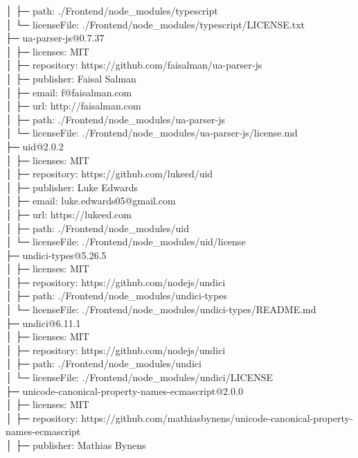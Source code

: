 │  ├─ path: ./Frontend/node\_modules/typescript\\
│  └─ licenseFile: ./Frontend/node\_modules/typescript/LICENSE.txt\\
├─ ua-parser-js@0.7.37\\
│  ├─ licenses: MIT\\
│  ├─ repository: https://github.com/faisalman/ua-parser-js\\
│  ├─ publisher: Faisal Salman\\
│  ├─ email: f@faisalman.com\\
│  ├─ url: http://faisalman.com\\
│  ├─ path: ./Frontend/node\_modules/ua-parser-js\\
│  └─ licenseFile: ./Frontend/node\_modules/ua-parser-js/license.md\\
├─ uid@2.0.2\\
│  ├─ licenses: MIT\\
│  ├─ repository: https://github.com/lukeed/uid\\
│  ├─ publisher: Luke Edwards\\
│  ├─ email: luke.edwards05@gmail.com\\
│  ├─ url: https://lukeed.com\\
│  ├─ path: ./Frontend/node\_modules/uid\\
│  └─ licenseFile: ./Frontend/node\_modules/uid/license\\
├─ undici-types@5.26.5\\
│  ├─ licenses: MIT\\
│  ├─ repository: https://github.com/nodejs/undici\\
│  ├─ path: ./Frontend/node\_modules/undici-types\\
│  └─ licenseFile: ./Frontend/node\_modules/undici-types/README.md\\
├─ undici@6.11.1\\
│  ├─ licenses: MIT\\
│  ├─ repository: https://github.com/nodejs/undici\\
│  ├─ path: ./Frontend/node\_modules/undici\\
│  └─ licenseFile: ./Frontend/node\_modules/undici/LICENSE\\
├─ unicode-canonical-property-names-ecmascript@2.0.0\\
│  ├─ licenses: MIT\\
│  ├─ repository: https://github.com/mathiasbynens/unicode-canonical-property-names-ecmascript\\
│  ├─ publisher: Mathias Bynens\\

